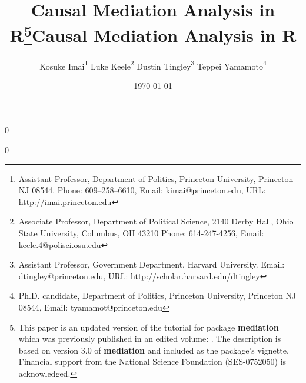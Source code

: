 \documentclass[11pt,letterpaper]{article}
\theoremstyle{plain}
\begin{document}
\newcommand\spacingset[1]{\renewcommand{\baselinestretch}%
{#1}\small\normalsize}

\spacingset{1.2}

\newcommand{\blind}{0}
\newcommand{\polisci}{1}

\newcommand{\tit}{Causal Mediation Analysis in R}




\blind

{\title{\bf \tit\thanks{This paper is an updated version of the tutorial
    for package {\bf mediation} which was previously published in an edited
    volume: \citet{imai:etal:10}.
    The description is based on version 3.0 of {\bf mediation} and included as 
    the package's vignette.
    Financial support from the National Science Foundation
    (SES-0752050) is acknowledged.}}

  \author{Kosuke Imai\thanks{Assistant Professor, Department of
      Politics, Princeton University, Princeton NJ 08544. Phone:
      609--258--6610, Email:
      \href{mailto:kimai@princeton.edu}{kimai@princeton.edu}, URL:
      \href{http://imai.princeton.edu}{http://imai.princeton.edu}}
    \quad \quad Luke Keele\thanks{Associate Professor, Department of
      Political Science, 2140 Derby Hall, Ohio State University,
      Columbus, OH 43210 Phone: 614-247-4256, Email:
      keele.4@polisci.osu.edu}
    \quad \quad Dustin Tingley\thanks{Assistant Professor, Government Department, Harvard University. Email:
      \href{dtingley@gov.harvard.edu}{dtingley@princeton.edu}, URL:
      \href{http://scholar.harvard.edu/dtingley}{http://scholar.harvard.edu/dtingley}}
    \quad \quad Teppei Yamamoto\thanks{Ph.D. candidate, Department of
      Politics, Princeton University, Princeton NJ 08544, Email: tyamamot@princeton.edu}
}

\date{ \today
}

\maketitle
}\fi

\blind \title{\bf \tit} %
\fi

\end{document}
